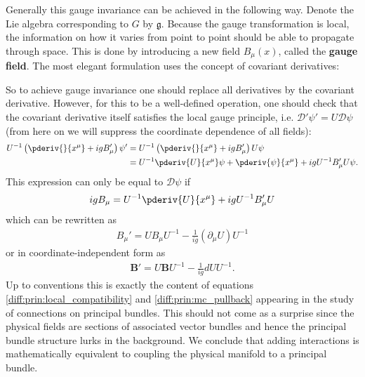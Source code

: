     Generally this gauge invariance can be achieved in the following way. Denote the Lie algebra corresponding to $G$ by $\mathfrak{g}$. Because the gauge transformation is local, the information on how it varies from point to point should be able to propagate through space. This is done by introducing a new field $B_\mu(x)$, called the \textbf{gauge field}. The most elegant formulation uses the concept of covariant derivatives:

    So to achieve gauge invariance one should replace all derivatives by the covariant derivative. However, for this to be a well-defined operation, one should check that the covariant derivative itself satisfies the local gauge principle, i.e. $\mathcal{D}'\psi' = U\mathcal{D}\psi$ (from here on we will suppress the coordinate dependence of all fields):
    \begin{align}
        U^{-1}\left(\pderiv{}{x^\mu} + igB_\mu'\right)\psi' &= U^{-1}\left(\pderiv{}{x^\mu} + igB_\mu'\right)U\psi\nonumber\\
        &= U^{-1}\pderiv{U}{x^\mu}\psi + \pderiv{\psi}{x^\mu} + igU^{-1}B_\mu'U\psi.
    \end{align}
    This expression can only be equal to $\mathcal{D}\psi$ if
    \begin{gather}
        igB_\mu = U^{-1}\pderiv{U}{x^\mu} + igU^{-1}B_\mu'U
    \end{gather}
    which can be rewritten as
    \begin{gather}
        B_\mu' = UB_\mu U^{-1} - \frac{1}{ig}(\partial_\mu U)U^{-1}
    \end{gather}
    or in coordinate-independent form as
    \begin{gather}
        \mathbf{B}' = U\mathbf{B}U^{-1} - \frac{1}{ig}dUU^{-1}.
    \end{gather}
    Up to conventions this is exactly the content of equations \ref{diff:prin:local_compatibility} and \ref{diff:prin:mc_pullback} appearing in the study of connections on principal bundles. This should not come as a surprise since the physical fields are sections of associated vector bundles and hence the principal bundle structure lurks in the background. We conclude that adding interactions is mathematically equivalent to coupling the physical manifold to a principal bundle.

